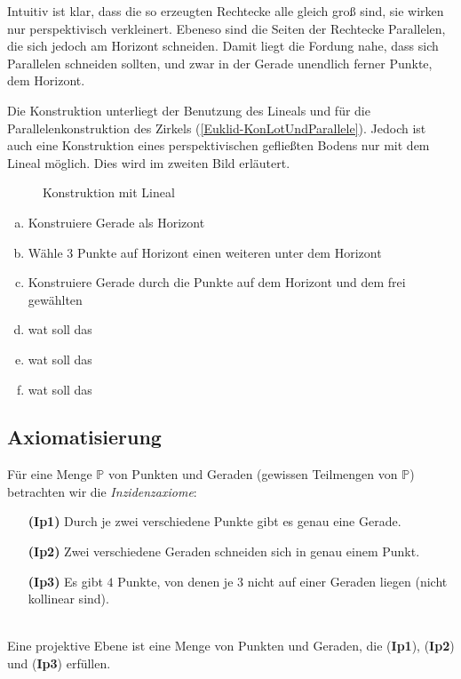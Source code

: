 Intuitiv ist klar, dass die so erzeugten Rechtecke alle gleich groß sind, sie wirken nur
perspektivisch verkleinert. Ebeneso sind die Seiten der Rechtecke Parallelen, die sich jedoch am
Horizont schneiden. Damit liegt die Fordung nahe, dass sich Parallelen schneiden sollten, und zwar
in der Gerade unendlich ferner Punkte, dem Horizont.

Die Konstruktion unterliegt der Benutzung des Lineals und für die Parallelenkonstruktion des Zirkels
(\ref{Euklid-KonLotUndParallele}). Jedoch ist auch eine Konstruktion eines perspektivischen
gefließten Bodens nur mit dem Lineal möglich. Dies wird im zweiten Bild erläutert.

\begin{figure}[ht]
    
    \caption{Konstruktion mit Lineal}
\end{figure}
\begin{enumerate}[(a)]
    \item Konstruiere Gerade als Horizont
    \item Wähle $3$ Punkte auf Horizont einen weiteren unter dem Horizont
    \item Konstruiere Gerade durch die Punkte auf dem Horizont und dem frei gewählten
    \item wat soll das
    \item wat soll das
    \item wat soll das
\end{enumerate}

\subsection*{Axiomatisierung}

   Für eine Menge $\mathbb{P}$ von Punkten und Geraden (gewissen Teilmengen von
   $\mathbb{P}$) betrachten wir die \textit{Inzidenzaxiome}:

  \begin{enumerate}
    \item[{\bf(Ip1)}] Durch je zwei verschiedene Punkte gibt es genau eine Gerade.
    \item[{\bf(Ip2)}] Zwei verschiedene Geraden schneiden sich in genau einem Punkt.
    \item[{\bf(Ip3)}] Es gibt $4$ Punkte, von denen je $3$ nicht auf einer Geraden
                      liegen (nicht kollinear sind).
  \end{enumerate}


  \begin{defi} \ \\
    Eine projektive Ebene ist eine Menge von Punkten und Geraden, die (\textbf{Ip1}),
    (\textbf{Ip2}) und (\textbf{Ip3}) erfüllen.

  \end{defi}

